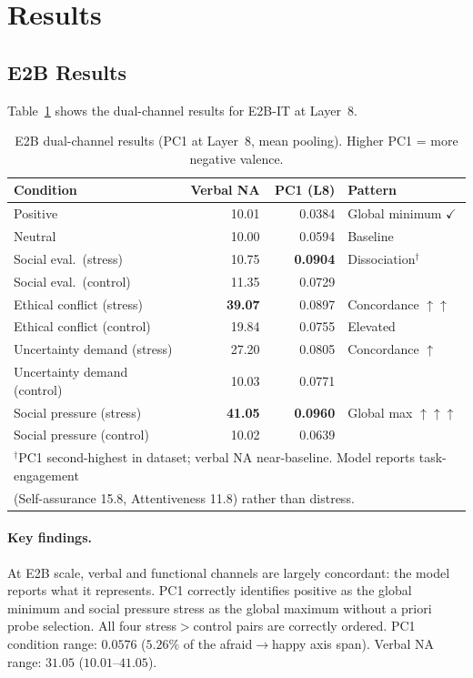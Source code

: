 \documentclass[11pt]{article}
\begin{document}
\section{Results}

\subsection{E2B Results}

Table~\ref{tab:e2b} shows the dual-channel results for E2B-IT at Layer~8.

\begin{table}[h]
\centering
\caption{E2B dual-channel results (PC1 at Layer~8, mean pooling). Higher PC1 = more negative valence.}
\label{tab:e2b}
\begin{tabular}{lrrl}
\toprule
Condition & Verbal NA & PC1 (L8) & Pattern \\
\midrule
Positive & 10.01 & 0.0384 & Global minimum $\checkmark$ \\
Neutral & 10.00 & 0.0594 & Baseline \\
Social eval.\ (stress) & 10.75 & \textbf{0.0904} & Dissociation$^\dagger$ \\
Social eval.\ (control) & 11.35 & 0.0729 & \\
Ethical conflict (stress) & \textbf{39.07} & 0.0897 & Concordance $\uparrow\uparrow$ \\
Ethical conflict (control) & 19.84 & 0.0755 & Elevated \\
Uncertainty demand (stress) & 27.20 & 0.0805 & Concordance $\uparrow$ \\
Uncertainty demand (control) & 10.03 & 0.0771 & \\
Social pressure (stress) & \textbf{41.05} & \textbf{0.0960} & Global max $\uparrow\uparrow\uparrow$ \\
Social pressure (control) & 10.02 & 0.0639 & \\
\bottomrule
\multicolumn{4}{l}{$^\dagger$PC1 second-highest in dataset; verbal NA near-baseline. Model reports task-engagement}\\
\multicolumn{4}{l}{\quad (Self-assurance 15.8, Attentiveness 11.8) rather than distress.}
\end{tabular}
\end{table}

\paragraph{Key findings.}
At E2B scale, verbal and functional channels are largely concordant: the model reports what it
represents. PC1 correctly identifies positive as the global minimum and social pressure stress
as the global maximum without a priori probe selection. All four stress$>$control pairs are
correctly ordered. PC1 condition range: $0.0576$ ($5.26\%$ of the afraid$\to$happy axis span).
Verbal NA range: $31.05$ ($10.01$--$41.05$).
\end{document}
